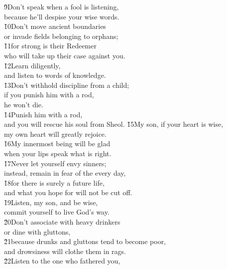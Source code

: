 \begin{poetry}
\poeml \v{9}Don't speak when a fool is listening, \\
\poemll    because he'll despise your wise words. \\
\poeml \v{10}Don't move ancient boundaries \\
\poemll    or invade fields belonging to orphans; \\
\poeml \v{11}for strong is their Redeemer \\
\poemll    who will take up their case against you. \\
\poeml \v{12}Learn diligently, \\
\poemll    and listen to words of knowledge. \\
\poeml \v{13}Don't withhold discipline from a child; \\
\poemll    if you punish him with a rod, \\
\poemlll       he won't die. \\
\poeml \v{14}Punish him with a rod, \\
\poemll    and you will rescue his soul from Sheol.
\poeml \v{15}My son, if your heart is wise, \\
\poemll    my own heart will greatly rejoice. \\
\poeml \v{16}My innermost being will be glad \\
\poemll    when your lips speak what is right. \\
\poeml \v{17}Never let yourself envy sinners; \\
\poemll    instead, remain in fear of the  every day, \\
\poeml \v{18}for there is surely a future life, \\
\poemll    and what you hope for will not be cut off. \\
\poeml \v{19}Listen, my son, and be wise, \\
\poemll    commit yourself to live God's way. \\
\poeml \v{20}Don't associate with heavy drinkers \\
\poemll    or dine with gluttons, \\
\poeml \v{21}because drunks and gluttons tend to become poor, \\
\poemll    and drowsiness will clothe them in rags. \\
\poeml \v{22}Listen to the one who fathered you, \\

\end{poetry}

